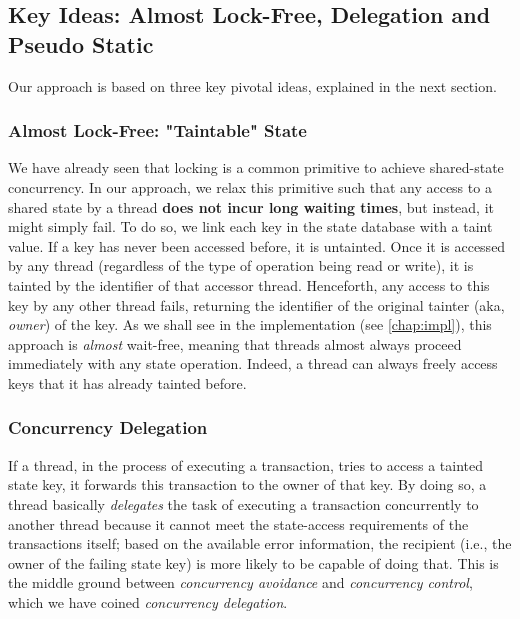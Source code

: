 \subsection{Key Ideas: Almost Lock-Free, Delegation and Pseudo Static}

Our approach is based on three key pivotal ideas, explained
in the next section.

\subsubsection{Almost Lock-Free: "Taintable" State}\label{chapt_approach:subsubsec:taintable_state}

We have already seen that locking is a common primitive to achieve shared-state concurrency. In our
approach, we relax this primitive such that any access to a shared state by a thread \textbf{does
not incur long waiting times}, but instead, it might simply fail. To do so, we link each key in the
state database with a taint value. If a key has never been accessed before, it is untainted. Once it
is accessed by any thread (regardless of the type of operation being read or write), it is tainted by the identifier of that
accessor thread. Henceforth, any access to this key by any other thread fails, returning the
identifier of the original tainter (aka, \textit{owner}) of the key. As we shall see in the
implementation (see \ref{chap:impl}), this approach is \textit{almost} wait-free, meaning that
threads almost always proceed immediately with any state operation. Indeed, a thread can always
freely access keys that it has already tainted before.

\subsubsection{Concurrency Delegation}

If a thread, in the process of executing a transaction, tries to access a tainted state key, it
forwards this transaction to the owner of that key. By doing so, a thread basically
\textit{delegates} the task of executing a transaction concurrently to another thread
because it cannot meet the state-access requirements of the transactions itself; based on the
available error information, the recipient (i.e., the owner of the failing state key) is more likely
to be capable of doing that. This is the middle ground between \textit{concurrency avoidance} and
\textit{concurrency control}, which we have coined \textit{concurrency delegation}.

